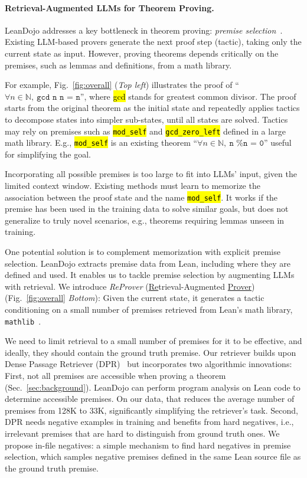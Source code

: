 \documentclass{article}
\DeclareRobustCommand{\hlgreen}[1]{{\sethlcolor{mygreen}\hl{#1}}}
\DeclareRobustCommand{\hlblue}[1]{{\sethlcolor{myblue}\hl{#1}}}
\DeclareRobustCommand{\hlorange}[1]{{\sethlcolor{myorange}\hl{#1}}}
\newcommand{\smallsec}[1]{\vspace{-1mm} \paragraph{#1.}}
\newcommand\name{ReProver}
\begin{document}
\smallsec{Retrieval-Augmented LLMs for Theorem Proving}
LeanDojo addresses a key bottleneck in theorem proving: \emph{premise selection}~\cite{urban2004mptp,irving2016deepmath}. Existing LLM-based provers generate the next proof step (tactic), taking only the current state as input. However, proving theorems depends critically on the premises, such as lemmas and definitions, from a math library.

For example, Fig.~\ref{fig:overall} (\emph{Top left}) illustrates the proof of ``$\forall n \in \mathbb{N},~\texttt{gcd n n = n}$'', where \hlblue{gcd} stands for greatest common divisor. The proof starts from the original theorem as the initial state and repeatedly applies tactics to decompose states into simpler sub-states, until all states are solved. Tactics may rely on premises such as \hlorange{\texttt{mod\_self}} and \hlgreen{\texttt{gcd\_zero\_left}} defined in a large math library. E.g., \hlorange{\texttt{mod\_self}} is an existing theorem ``$\forall n \in \mathbb{N},~\texttt{n \% n = 0}$'' useful for simplifying the goal.

Incorporating all possible premises is too large to fit into LLMs' input, given the limited context window. Existing methods must learn to memorize the association between the proof state and the name \hlorange{\texttt{mod\_self}}. It works if the premise has been used in the training data to solve similar goals, but does not generalize to truly novel scenarios, e.g., theorems requiring lemmas unseen in training.    

One potential solution is to complement memorization with explicit premise selection. LeanDojo extracts premise data from Lean, including where they are defined and used. It enables us to tackle premise selection by augmenting LLMs with retrieval. We introduce \emph{\name} (\underline{Re}trieval-Augmented \underline{Prover}) (Fig.~\ref{fig:overall} \emph{Bottom}): Given the current state, it generates a tactic conditioning on a small number of premises retrieved from Lean's math library, \texttt{mathlib}~\cite{mathlib}. 
 
We need to limit retrieval to a small number of premises for it to be effective, and ideally, they should contain the ground truth premise. Our retriever builds upon Dense Passage Retriever (DPR)~\cite{karpukhin2020dense} but incorporates two algorithmic innovations: First, not all premises are accessible when proving a theorem (Sec.~\ref{sec:background}). LeanDojo can perform program analysis on Lean code to determine accessible premises. On our data, that reduces the average number of premises from 128K to 33K, significantly simplifying the retriever's task. Second, DPR needs negative examples in training and benefits from hard negatives, i.e., irrelevant premises that are hard to distinguish from ground truth ones. We propose in-file negatives: a simple mechanism to find hard negatives in premise selection, which samples negative premises defined in the same Lean source file as the ground truth premise. 
\end{document}
